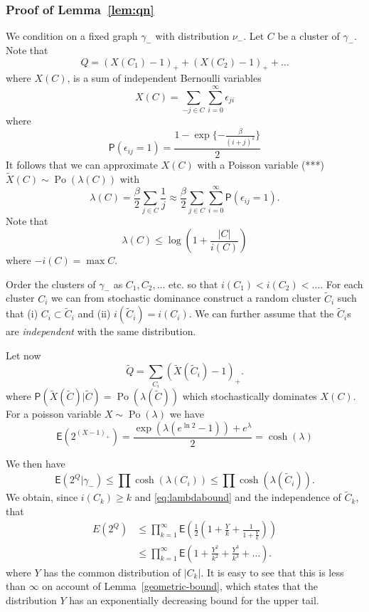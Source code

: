 \documentclass[11pt, a4paper]{amsart}
\theoremstyle{definition}
\theoremstyle{remark}
\providecommand{\qr}{\eqref}
\providecommand{\opn}{\operatorname}
\renewcommand{\P}{\mathsf{P}}
\providecommand{\E}{\mathsf{E}}
\providecommand{\e}{\epsilon}
\providecommand{\tl}{\tilde}
\providecommand{\g}{\gamma}
\begin{document}
\subsubsection*{Proof of Lemma~\ref{lem:qn}}

We condition on a fixed graph $\g_-$ with distribution $\nu_-$. Let $C$ be a
cluster of $\g_-$. Note that
$$ Q=(X(C_1) -1)_{+} +(X(C_2)-1)_{+} + \ldots $$
where $X(C)$, is a sum of independent Bernoulli variables
$$ X(C) = \sum_{-j\in C} \sum_{i=0}^\infty \e_{ji} $$
where
$$
\P(\e_{ij}=1) = \frac{1- \exp\{-\frac \beta{(i+j)^2}\}}{2}
$$
It follows that we can approximate $X(C)$ with a Poisson variable (***)
$\tl X(C) \sim \opn{Po}(\lambda(C))$ with
$$
\lambda(C) = \frac{\beta}{2} \sum_{j\in C} \frac 1j
\approx \frac{\beta}{2} \sum_{j\in C} \sum_{i=0}^\infty \P(\e_{ij}=1).
$$
Note that
\begin{equation}
  \label{eq:lambdabound}
    \lambda(C) \leq \log \left(1+\frac{|C|}{i(C)}\right)
\end{equation}
where $-i(C)=\max C$.

Order the clusters of $\g_-$ as $C_1,C_2,\dots$ etc. so that
$i(C_1)<i(C_2)<\dots$. For each cluster $C_i$ we can from stochastic dominance
construct a random cluster $\tl C_i$ such that (i) $C_i \subset \tl C_i$ and (ii)
$i(\tl C_i)=i(C_i)$. We can further assume that the $\tl C_i$s are
\emph{independent} with the same distribution.

Let now
\[
  \tl Q = \sum_{C_i} (\tl X(\tl C_i) - 1)_+.
\]
where $\P(\tl X(\tl C)| \tl C) = \opn{Po}(\lambda(\tl C))$ which stochastically
dominates $X(C)$. For a poisson variable $X\sim\opn{Po}(\lambda)$ we have
\[
  \E(2^{(X-1)_+}) = \frac{\exp(\lambda(e^{\ln 2}-1)) + e^{\lambda}}{2} = \cosh(\lambda)
\]

We then have
$$
\E(2^Q | \gamma_- ) \leq \prod \cosh (\lambda(C_i))\leq \prod \cosh (\lambda (\tilde C_i)).
$$
We obtain, since $i(C_k)\geq k$ and \qr{eq:lambdabound} and the independence of
$\tl C_k$, that
\begin{align}
  E(2^Q) &\leq \prod_{k=1}^\infty \E\left(\frac{1}{2}\left(1+\frac{Y}{k}+\frac{1}{1+\frac{Y}{k}}\right) \right) \\
         &\leq \prod_{k=1}^\infty \E\left(1+\frac{Y^2}{k^2} + \frac{Y^3}{k^3} + \dots \right).
\end{align}
where $Y$ has the common distribution of $|C_k|$. It is easy to see that this is
less than $\infty$ on account of Lemma~\ref{geometric-bound}, which states that the
distribution $Y$ has an exponentially decreasing bound for the upper tail.
\end{document}
